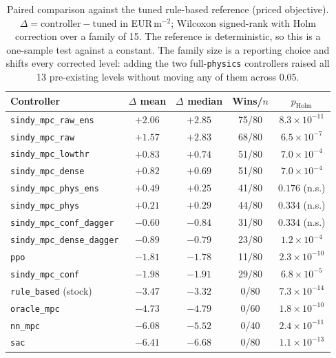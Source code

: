 \begin{table}[t]
\centering
\caption{Paired comparison against the tuned rule-based reference (priced objective).
$\Delta = \text{controller} - \text{tuned}$ in EUR\,m$^{-2}$; Wilcoxon signed-rank
\cite{wilcoxon1945} with Holm correction \cite{holm1979} over a family of 15. The
reference is deterministic, so this is a one-sample test against a constant. The family
size is a reporting choice and shifts every corrected level: adding the two
full-\texttt{physics} controllers raised all 13 pre-existing levels without moving
any of them across $0.05$.}
\label{tab:wilcoxon}
\small
\begin{tabular}{@{}lcccc@{}}
\toprule
Controller & $\Delta$ mean & $\Delta$ median & Wins/$n$ & $p_{\text{Holm}}$ \\
\midrule
\texttt{sindy\_mpc\_raw\_ens}     & $+2.06$ & $+2.85$ & 75/80 & $8.3\times10^{-11}$ \\
\texttt{sindy\_mpc\_raw}          & $+1.57$ & $+2.83$ & 68/80 & $6.5\times10^{-7}$ \\
\texttt{sindy\_mpc\_lowthr}       & $+0.83$ & $+0.74$ & 51/80 & $7.0\times10^{-4}$ \\
\texttt{sindy\_mpc\_dense}        & $+0.82$ & $+0.69$ & 51/80 & $7.0\times10^{-4}$ \\
\texttt{sindy\_mpc\_phys\_ens}    & $+0.49$ & $+0.25$ & 41/80 & $0.176$ (n.s.) \\
\texttt{sindy\_mpc\_phys}         & $+0.21$ & $+0.29$ & 44/80 & $0.334$ (n.s.) \\
\texttt{sindy\_mpc\_conf\_dagger} & $-0.60$ & $-0.84$ & 31/80 & $0.334$ (n.s.) \\
\texttt{sindy\_mpc\_dense\_dagger}& $-0.89$ & $-0.79$ & 23/80 & $1.2\times10^{-4}$ \\
\texttt{ppo}                      & $-1.81$ & $-1.78$ & 11/80 & $2.3\times10^{-10}$ \\
\texttt{sindy\_mpc\_conf}         & $-1.98$ & $-1.91$ & 29/80 & $6.8\times10^{-5}$ \\
\texttt{rule\_based} (stock)      & $-3.47$ & $-3.32$ & 0/80  & $7.3\times10^{-14}$ \\
\texttt{oracle\_mpc}              & $-4.73$ & $-4.79$ & 0/60  & $1.8\times10^{-10}$ \\
\texttt{nn\_mpc}                  & $-6.08$ & $-5.52$ & 0/40  & $2.4\times10^{-11}$ \\
\texttt{sac}                      & $-6.41$ & $-6.68$ & 0/80  & $1.1\times10^{-13}$ \\
\bottomrule
\end{tabular}
\end{table}

